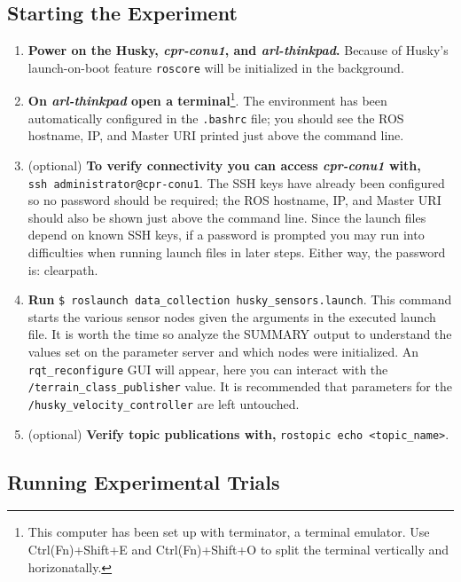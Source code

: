 \documentclass[
	12pt, %
]{fphw}
\newcommand{\code}[1]{\colorbox{light-gray}{\texttt{#1}}}
\begin{document}
\subsection{Starting the Experiment}
\begin{enumerate}
\item \textbf{Power on the Husky, \emph{cpr-conu1}, and \emph{arl-thinkpad}.} Because of Husky's launch-on-boot feature \code{roscore} will be initialized in the background.

\item \textbf{On \emph{arl-thinkpad} open a terminal}\footnote{This computer has been set up with terminator, a terminal emulator. Use Ctrl(Fn)+Shift+E and Ctrl(Fn)+Shift+O to split the terminal vertically and horizonatally.}. The environment has been automatically configured in the \code{.bashrc} file; you should see the ROS hostname, IP, and Master URI printed just above the command line.
  
\item (optional) \textbf{To verify connectivity you can access \emph{cpr-conu1} with,} \\
  \code{ssh administrator@cpr-conu1}. The SSH keys have already been configured so no password should be required; the ROS hostname, IP, and Master URI should also be shown just above the command line. Since the launch files depend on known SSH keys, if a password is prompted you may run into difficulties when running launch files in later steps. Either way, the password is: clearpath.

\item \textbf{Run} \code{\$ roslaunch data\_collection husky\_sensors.launch}. This command starts the various sensor nodes given the arguments in the executed launch file. It is worth the time so analyze the SUMMARY output to understand the values set on the parameter server and which nodes were initialized. An \code{rqt\_reconfigure} GUI will appear, here you can interact with the \\ \code{/terrain\_class\_publisher} value. It is recommended that parameters for the \code{/husky\_velocity\_controller} are left untouched.

\item (optional) \textbf{Verify topic publications with,} \code{rostopic echo <topic\_name>}.

\end{enumerate}
 
\subsection{Running Experimental Trials}
\end{document}
